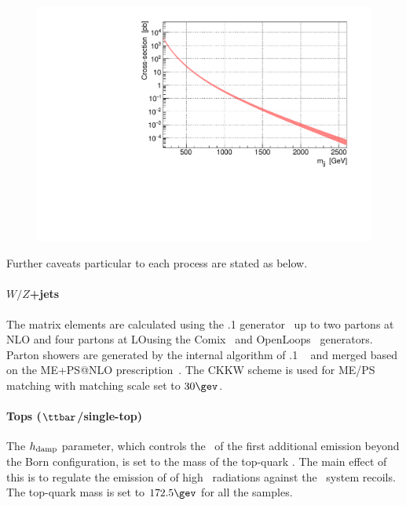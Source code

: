 \begin{figure}
  \begin{center}
    \includegraphics[width=140mm]{figures/Samples/xsec_GG/xsec_GG.pdf}
    \label{fig::Samples::xsec_GG}
  \end{center}
\end{figure}


\noindent Further caveats particular to each process are stated as below.

\paragraph{$W/Z$+jets} 
The matrix elements are calculated using the .1 generator~\cite{Gleisberg:2008ta} up to two partons at NLO and four partons at LO\@ using the Comix~\cite{Gleisberg:2008fv} and OpenLoops~\cite{Cascioli:2011va} generators. 
Parton showers are generated by the internal algorithm of .1 ~\cite{Schumann:2007mg} and merged based on the ME+PS@NLO prescription~\cite{Hoeche:2012yf}.
The CKKW scheme is used for ME/PS matching with matching scale set to $30\gev$.\\


\paragraph{Tops ($\ttbar$/single-top)}
The $h_{\rm damp}$ parameter, which controls the \pt\ of the first additional emission beyond the Born configuration, is set to the mass of the top-quark \cite{ATLAS_ttbarGen_Run1}. 
The main effect of this is to regulate the emission of of high \pt\ radiations against the \ttbar\ system recoils. The top-quark mass is set to $172.5 \gev$ for all the samples. \\


